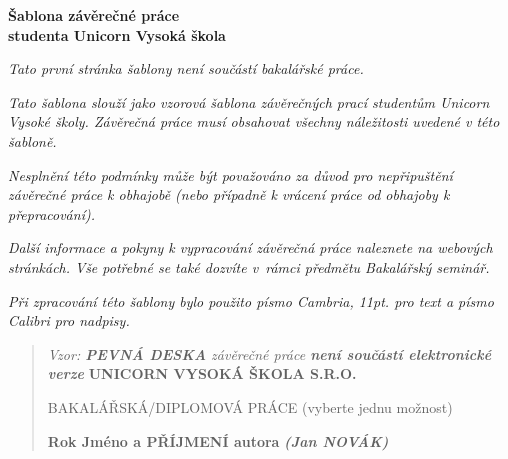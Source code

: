 \documentclass[
]{article}
\author{}
\date{}
\begin{document}
    \thispagestyle{empty}
    \textbf{Šablona závěrečné práce\\
    studenta Unicorn Vysoká škola}

    \emph{Tato první stránka šablony není součástí bakalářské práce.}

    \emph{Tato šablona slouží jako vzorová šablona závěrečných prací
    studentům Unicorn Vysoké školy. Závěrečná práce musí obsahovat všechny
    náležitosti uvedené v této šabloně.}

    \emph{Nesplnění této podmínky může být považováno za důvod pro
    nepřipuštění závěrečné práce k obhajobě (nebo případně k vrácení práce
    od obhajoby k přepracování).}

    \emph{Další informace a pokyny k vypracování závěrečná práce naleznete
    na webových stránkách. Vše potřebné se také dozvíte v~rámci předmětu
    Bakalářský seminář.}

    \emph{Při zpracování této šablony bylo použito písmo Cambria, 11pt. pro
    text a písmo Calibri pro nadpisy.}

    \newpage
    \pagebreak
    \begin{quote}
        \thispagestyle{empty}
        \emph{Vzor: \textbf{PEVNÁ DESKA} závěrečné práce \textbf{není součástí
        elektronické verze}}
        \textbf{UNICORN VYSOKÁ ŠKOLA S.R.O.}

        \hspace{0pt}
        \vfill
        BAKALÁŘSKÁ/DIPLOMOVÁ PRÁCE (vyberte jednu možnost)
        \vfill
        \hspace{0pt}

        \textbf{Rok Jméno a PŘÍJMENÍ autora}
        \emph{\textbf{(Jan NOVÁK)}}
        \pagebreak
    \end{quote}
\end{document}
